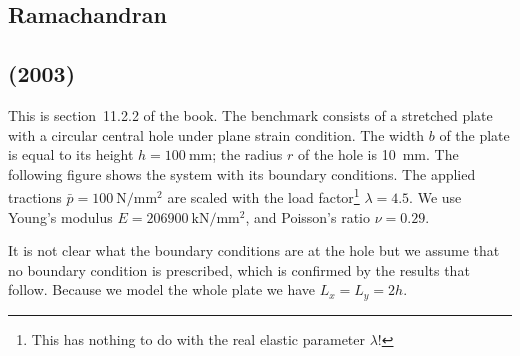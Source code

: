 \subsection*{Ramachandran}




\newpage
\subsection*{\textcite{rarr03} (2003)}

This is section~11.2.2 of the book.
The benchmark consists of a stretched plate with a circular central hole under plane strain condition. 
The width $b$ of the plate is 
equal to its height $h = \SI{100}{\mm}$; the radius $r$ of the hole is \SI{10}{\mm}. 
The following figure shows the system with its boundary conditions. The applied tractions 
$\bar{p} = \SI{100}{\newton\per\square\mm}$ are scaled with the load factor\footnote{This has 
nothing to do with the real elastic parameter $\lambda$!} $\lambda=4.5$.
We use Young's modulus $E = \SI{206 900}{\kilo\newton\per\square\mm}$, and Poisson's ratio $\nu = 0.29$.

It is not clear what the boundary conditions are at the hole but we assume that no boundary
condition is prescribed, which is confirmed by the results that follow.
Because we model the whole plate we have $L_x=L_y=2h$.

